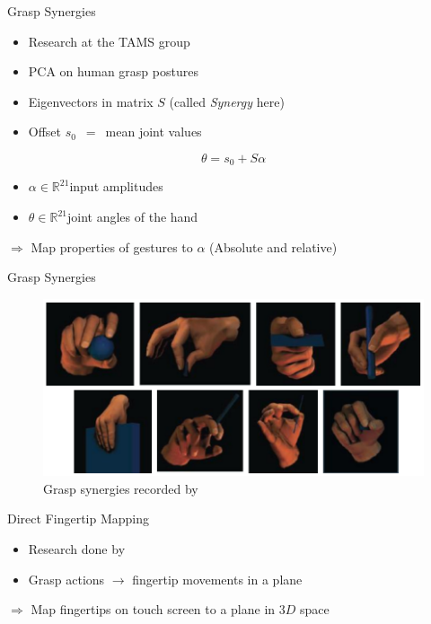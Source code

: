 \documentclass[t]{beamer}
\begin{document}
\begin{frame}{Grasp Synergies}
\begin{itemize}
	\item Research at the TAMS group \cite{Bernardino2013}
	\item PCA on human grasp postures
	\item Eigenvectors in matrix $S$ (called \textit{Synergy} here)
	\item Offset $s_0$~$=$~mean joint values 
\end{itemize}

\begin{equation}
\theta = s_0 + S\alpha
\end{equation}

\begin{itemize}
	\item $\alpha \in \mathbb{R}^{21}$\quad input amplitudes
	\item $\theta \in \mathbb{R}^{21}$\quad joint angles of the hand
\end{itemize}

$\Rightarrow$ Map properties of gestures to $\alpha$ (Absolute and relative)

\end{frame}

\begin{frame}{Grasp Synergies}
\begin{figure}
	\includegraphics[height=0.6\textheight]{assets/pres/grasps.PNG}
	\caption{Grasp synergies recorded by \citeauthor{Bernardino2013}\cite{Bernardino2013}}
\end{figure}
\end{frame}

\begin{frame}{Direct Fingertip Mapping}
\begin{itemize}
	\item Research done by \citeauthor{conf:humanoids:TohHLBZP12} \cite{conf:humanoids:TohHLBZP12}
	\item Grasp actions $\rightarrow$ fingertip movements in a plane
\end{itemize}

$\Rightarrow$ Map fingertips on touch screen to a plane in $3D$ space
\end{frame}
\end{document}
